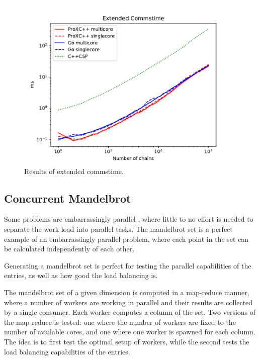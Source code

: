 \begin{figure}[h!]
    \centering
    \includegraphics[width=0.8\linewidth]{fig/extended_commstime}
    \caption{Results of extended commstime.}
    \label{fig:extended_commstime}
\end{figure}


\subsection{Concurrent Mandelbrot}


Some problems are embarrassingly parallel \citep{wilkinson1999parallel}, where little to no effort is needed to separate the work load into parallel tasks. The mandelbrot set is a perfect example of an embarrassingly parallel problem, where each point in the set can be calculated independently of each other.

Generating a mandelbrot set is perfect for testing the parallel capabilities of the entries, as well as how good the load balancing is.

The mandelbrot set of a given dimension is computed in a map\hyp{}reduce manner, where a number of workers are working in parallel and their results are collected by a single consumer. Each worker computes a column of the set. Two versions of the map\hyp{}reduce is tested: one where the number of workers are fixed to the number of available cores, and one where one worker is spawned for each column. The idea is to first test the optimal setup of workers, while the second tests the load balancing capabilities of the entries. 

